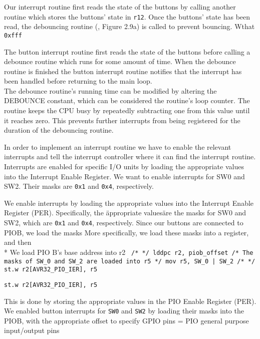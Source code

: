 Our interrupt routine first reads the state of the buttons by calling another routine which stores the buttons' state in \texttt{r12}.
Once the buttons' state has been read, the debouncing routine (\cite{lab-compendium}, Figure 2.9a) is called to prevent bouncing. 
Wthat \texttt{0xfff} 


The button interrupt routine first reads the state of the buttons before calling a debounce routine which runs for some amount of time.
When the debounce routine is finished the button interrupt routine notifies that the interrupt has been handled before returning to the main loop.
\\ %
The debounce routine's running time can be modified by altering the DEBOUNCE constant, which can be considered the routine's loop counter. The routine keeps the CPU busy by repeatedly subtracting one from this value until it reaches zero. This prevents further interrupts from being registered for the duration of the debouncing routine.

In order to implement an interrupt routine we have to enable the relevant interrupts and tell the interrupt controller where it can find the interrupt routine.
Interrupts are enabled for specific I/O units by loading the appropriate values into the Interrupt Enable Register.
We want to enable interrupts for SW0 and SW2.
Their masks are \texttt{0x1} and \texttt{0x4}, respectively.


We enable interrupts by loading the appropriate values into the Interrupt Enable Register (PER).
Specifically, the \"appropriate values\" are the masks for SW0 and SW2, which are \texttt{0x1} and \texttt{0x4}, respectively.
Since our buttons are connected to PIOB, we load the masks
More specifically, we load these masks into a register, and then 
\\*
We load PIO B's base address into r2
\texttt{
		/* */
		lddpc r2, piob_offset
		/* The masks of SW_0 and SW_2 are loaded into r5 */
		mov r5, SW_0 | SW_2
		/* */
		st.w r2[AVR32_PIO_IER], r5
}

\texttt{st.w r2[AVR32_PIO_IER], r5 }

This is done by storing the appropriate values in the PIO Enable Register (PER).
We enabled button interrupts for \texttt{SW0} and \texttt{SW2} by loading their masks into the PIOB, with the appropriate offset to specify
GPIO pins = PIO
general purpose input/output pins

